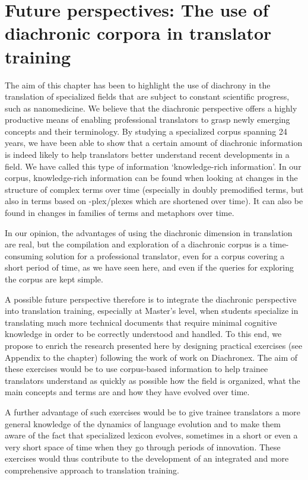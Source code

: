\documentclass[output=paper]{langscibook}
\begin{document}
\section{Future perspectives: The use of diachronic corpora in translator training}

The aim of this chapter has been to highlight the use of diachrony in the translation of specialized fields that are subject to constant scientific progress, such as nanomedicine. We believe that the diachronic perspective offers a highly productive means of enabling professional translators to grasp newly emerging concepts and their terminology. By studying a specialized corpus spanning 24 years, we have been able to show that a certain amount of diachronic information is indeed likely to help translators better understand recent developments in a field. We have called this type of information ‘knowledge-rich information’. In our corpus, knowledge-rich information can be found when looking at changes in the structure of complex terms over time (especially in doubly premodified terms, but also in terms based on -plex/plexes which are shortened over time). It can also be found in changes in families of terms and metaphors over time.

In our opinion, the advantages of using the diachronic dimension in translation are real, but the compilation and exploration of a diachronic corpus is a time-consuming solution for a professional translator, even for a corpus covering a short period of time, as we have seen here, and even if the queries for exploring the corpus are kept simple.

A possible future perspective therefore is to integrate the diachronic perspective into translation training, especially at Master’s level, when students specialize in translating much more technical documents that require minimal cognitive knowledge in order to be correctly understood and handled. To this end, we propose to enrich the research presented here by designing practical exercises (see Appendix to the chapter) following the work of     work on Diachronex. The aim of these exercises would be to use corpus-based information to help trainee translators understand as quickly as possible how the field is organized, what the main concepts and terms are and how they have evolved over time.

A further advantage of such exercises would be to give trainee translators a more general knowledge of the dynamics of language evolution and to make them aware of the fact that specialized lexicon evolves, sometimes in a short or even a very short space of time when they go through periods of innovation. These exercises would thus contribute to the development of an integrated and more comprehensive approach to translation training.
\end{document}
